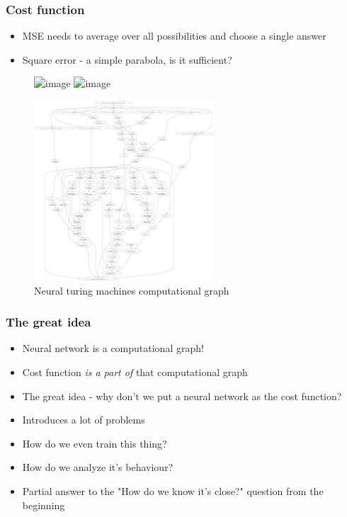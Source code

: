 \documentclass{Bredelebeamer}
\begin{document}
\begin{frame}
	\frametitle{Cost function}
	\begin{itemize}
		\item MSE needs to average over all possibilities and choose a single answer
		\item Square error - a simple parabola, is it sufficient?
	\end{itemize}
	\begin{figure}[h!]
		\centering
		\includegraphics<1>[width=\textwidth]{predict_frame.png}
		\includegraphics<2->[width=\textwidth]{mse_vs_adversarial.png}
	\end{figure}
\end{frame}

\begin{frame}
	\begin{figure}[h!]
	\centering
	\includegraphics[width=0.6\textwidth]{ntm_comp_graph.jpg}
	\caption{Neural turing machines computational graph}
	\label{fig:ntm_comp_graph}
	\end{figure}

\end{frame}
\begin{frame}
	\frametitle{The great idea}
	\begin{itemize}[<+->]
		\item Neural network is a computational graph!
		\item Cost function \textit{is a part of} that computational graph
		\item The great idea - why don't we put a neural network as the cost function?
		\item Introduces a lot of problems
		\item How do we even train this thing?
		\item How do we analyze it's behaviour?
		\item Partial answer to the "How do we know it's close?" question from the beginning
	\end{itemize}
\end{frame}
\end{document}
